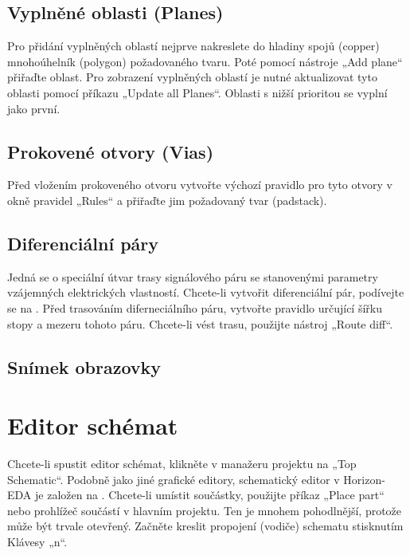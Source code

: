 \documentclass[letterpaper,10pt,czech]{sphinxmanual}
\begin{document}
\section{Vyplněné oblasti (Planes)}
\label{\detokenize{imp-board:vyplnene-oblasti-planes}}
Pro přidání vyplněných oblastí nejprve nakreslete do hladiny spojů (copper) mnohoúhelník (polygon) požadovaného tvaru. Poté pomocí nástroje „Add plane“ přiřaďte oblast. Pro zobrazení vyplněných oblastí je nutné aktualizovat tyto oblasti pomocí příkazu „Update all Planes“. Oblasti s
nižší prioritou se vyplní jako první.


\section{Prokovené otvory (Vias)}
\label{\detokenize{imp-board:prokovene-otvory-vias}}
Před vložením prokoveného otvoru vytvořte výchozí pravidlo pro tyto otvory v okně pravidel „Rules“
a přiřaďte jim požadovaný tvar (padstack).


\section{Diferenciální páry}
\label{\detokenize{imp-board:diferencialni-pary}}
Jedná se o speciální útvar trasy signálového páru se stanovenými parametry vzájemných elektrických vlastností. Chcete-li vytvořit diferenciální pár, podívejte se na {\hyperref[\detokenize{imp-sch:diferencialni-pary}]{}}. Před trasováním diferneciálního páru, vytvořte pravidlo určující šířku stopy a mezeru tohoto páru. Chcete-li vést trasu, použijte nástroj „Route diff“.


\section{Snímek obrazovky}
\label{\detokenize{imp-board:snimek-obrazovky}}
\noindent{}


\chapter{Editor schémat}
\label{\detokenize{imp-sch:editor-schemat}}\label{\detokenize{imp-sch::doc}}
Chcete-li spustit editor schémat, klikněte v manažeru projektu na „Top Schematic“. Podobně jako jiné grafické editory, schematický editor v Horizon-EDA je založen na {\hyperref[\detokenize{imp::doc}]{}}. Chcete-li umístit součástky, použijte příkaz „Place part“ nebo prohlížeč součástí v hlavním projektu. Ten je mnohem pohodlnější, protože může být trvale otevřený. Začněte kreslit propojení (vodiče) schematu stisknutím Klávesy „n“.
\end{document}
